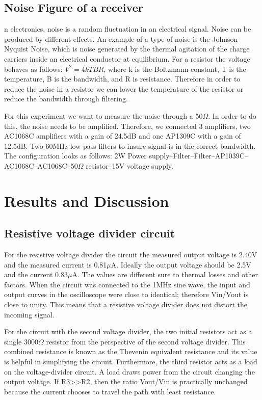 \documentclass[12pt]{article}
\begin{document}
\subsection {Noise Figure of a receiver}
n electronics, noise is a random fluctuation in an electrical
signal. Noise can be produced by different effects. An example of a type
of noise is the Johnson-Nyquist Noise, which is noise generated by the
thermal agitation of the charge carriers inside an electrical conductor
at equilibrium. For a resistor the voltage behaves as follows:
$V^2=4kTBR$, where k is the Boltzmann constant, T is the temperature, B is
the bandwidth, and R is resistance. Therefore in order to reduce the
noise in a resistor we can lower the temperature of the resistor or
reduce the bandwidth through filtering. 

For this experiment we want to measure the noise through a 50$\Omega$. In order
to do this, the noise needs to be amplified. Therefore, we connected 3
amplifiers, two AC1068C amplifiers with a gain of 24.5dB and one AP1309C
with a gain of 12.5dB. Two 60MHz low pass filters to insure signal is in
the correct bandwidth. The configuration looks as follows:
2W Power supply--Filter--Filter--AP1039C--AC1068C--AC1068C--50$\Omega$
resistor--15V voltage supply.

\section {Results and Discussion}
\subsection {Resistive voltage divider circuit}
For the resistive voltage divider the circuit the measured output
voltage is 2.40V and the measured current is 0.81$\mu$A. Ideally the output
voltage should be 2.5V and the current 0.83$\mu$A. The values are different
sure to thermal losses and other factors. When the circuit was connected
to the 1MHz sine wave, the input and output curves in the oscilloscope
were close to identical; therefore Vin/Vout is close to unity. This
means that a resistive voltage divider does not distort the incoming
signal.
 

For the circuit with the second voltage divider, the two initial
resistors act as a single 3000$\Omega$ resistor from the perspective of the
second voltage divider. This combined resistance is known as the
Thevenin equivalent resistance and its value is helpful in simplifying
the circuit. Furthermore, the third resistor acts as a load on the
voltage-divider circuit. A load draws power from the circuit changing
the output voltage. If R3>>R2, then the ratio Vout/Vin is practically
unchanged because the current chooses to travel the path with least
resistance.
 
\end{document}
